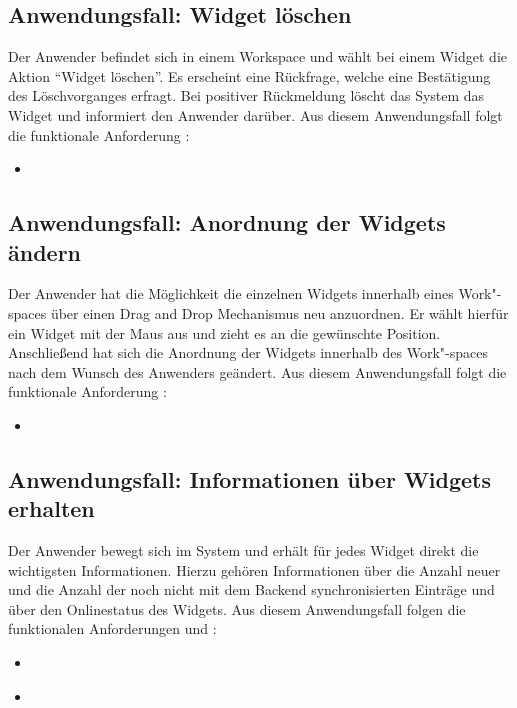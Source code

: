 \subsection{Anwendungsfall: Widget löschen}
Der Anwender befindet sich in einem Workspace und wählt bei einem Widget die Aktion "`Widget löschen"'. Es erscheint eine Rückfrage, welche eine Bestätigung des Löschvorganges erfragt. Bei positiver Rückmeldung löscht das System das Widget und informiert den Anwender darüber. Aus diesem Anwendungsfall folgt die funktionale Anforderung :
\begin{itemize}
 \item \requirementf{\requirementWidgetDelete}\label{requirementWidgetDelete}
\end{itemize}
 
\subsection{Anwendungsfall: Anordnung der Widgets ändern}
Der Anwender hat die Möglichkeit die einzelnen Widgets innerhalb eines Work"-spaces über einen Drag and Drop Mechanismus neu anzuordnen. Er wählt hierfür ein Widget mit der Maus aus und zieht es an die gewünschte Position. Anschließend hat sich die Anordnung der Widgets innerhalb des Work"-spaces nach dem Wunsch des Anwenders geändert. Aus diesem Anwendungsfall folgt die funktionale Anforderung :
\begin{itemize}
 \item \requirementf{\requirementWidgetSortDragNDrop}\label{requirementWidgetSortDragNDrop}
\end{itemize}

\subsection{Anwendungsfall: Informationen über Widgets erhalten}
Der Anwender bewegt sich im System und erhält für jedes Widget direkt die wichtigsten Informationen. Hierzu gehören Informationen über die Anzahl neuer und die Anzahl der noch nicht mit dem Backend synchronisierten Einträge und über den Onlinestatus des Widgets. Aus diesem Anwendungsfall folgen die funktionalen Anforderungen  und :
\begin{itemize}
 \item \requirementf{\requirementWidgetInformSystem}\label{requirementWidgetInformSystem}
 \item \requirementf{\requirementWidgetInformUser}\label{requirementWidgetInformUser}
\end{itemize}

